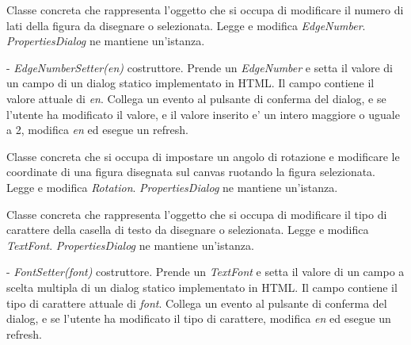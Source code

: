 Classe concreta che rappresenta l'oggetto che si occupa di modificare il numero di lati della figura da disegnare o selezionata.
Legge e modifica \textit{EdgeNumber}.
\textit{PropertiesDialog} ne mantiene un'istanza.
\begin{elencopuntato}[\subsubsecindent]
\item[-] \textit{EdgeNumberSetter(en)} costruttore. Prende un \textit{EdgeNumber} e setta il valore di un campo di un dialog statico implementato in HTML. Il campo contiene il valore attuale di \textit{en}. Collega un evento al pulsante di conferma del dialog, e se l'utente ha modificato il valore, e il valore inserito e' un intero maggiore o uguale a 2, modifica \textit{en} ed esegue un refresh.
\end{elencopuntato}

Classe concreta che si occupa di impostare un angolo di rotazione e modificare le coordinate di una figura disegnata sul canvas ruotando la figura selezionata.
Legge e modifica \textit{Rotation}.
\textit{PropertiesDialog} ne mantiene un'istanza.

Classe concreta che rappresenta l'oggetto che si occupa di modificare il tipo di carattere della casella di testo da disegnare o selezionata.
Legge e modifica \textit{TextFont}.
\textit{PropertiesDialog} ne mantiene un'istanza.
\begin{elencopuntato}[\subsubsecindent]
\item[-] \textit{FontSetter(font)} costruttore. Prende un \textit{TextFont} e setta il valore di un campo a scelta multipla di un dialog statico implementato in HTML. Il campo contiene il tipo di carattere attuale di \textit{font}. Collega un evento al pulsante di conferma del dialog, e se l'utente ha modificato il tipo di carattere, modifica \textit{en} ed esegue un refresh.
\end{elencopuntato}

